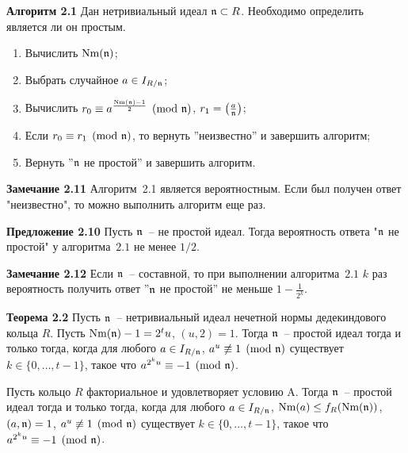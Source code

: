\documentclass[_00_autoref.tex]{subfiles}
\begin{document}
\textbf{Алгоритм 2.1}\label{algorithm:solovay_strassen}
    Дан нетривиальный идеал $\mathfrak{n} \subset R$.
    Необходимо определить является ли он простым.

    \begin{enumerate}
        \item Вычислить $\textrm{Nm}(\mathfrak{n})$;
        
        \item Выбрать случайное $a \in I_{R/\mathfrak{n}}$;

        \item Вычислить $r_0 \equiv a^{\frac{\textrm{Nm}(\mathfrak{n}) - 1}{2}} \pmod{\mathfrak{n}}$, $r_1 = \left(\frac{a}{\mathfrak{n}}\right)$;

        \item Если $r_0 \equiv r_1 \pmod{\mathfrak{n}}$, то вернуть ''неизвестно'' и завершить алгоритм;

        \item Вернуть ''$\mathfrak{n}$ не простой'' и завершить алгоритм.
    \end{enumerate}

\textbf{Замечание 2.11}
    Алгоритм~2.1 является вероятностным.
    Если был получен ответ "неизвестно", то можно выполнить алгоритм еще раз.

\textbf{Предложение 2.10}
    Пусть $\mathfrak{n}$~-- не простой идеал.
    Тогда вероятность ответа "$\mathfrak{n}$ не простой" у алгоритма~$2.1$ не менее $1/2$.

\textbf{Замечание 2.12}
    Если $\mathfrak{n}$~-- составной, то при выполнении алгоритма~$2.1$ $k$ раз вероятность получить ответ ''$\mathfrak{n}$ не простой'' не меньше $1 - \frac{1}{2^k}$.


\textbf{Теорема 2.2}\label{theorem:miller_criteria}
    Пусть $\mathfrak{n}$~-- нетривиальный идеал нечетной нормы дедекиндового кольца $R$.
    Пусть $\textrm{Nm}(\mathfrak{n}) - 1 = 2^t u$, $(u, 2) = 1$.
    Тогда $\mathfrak{n}$~-- простой идеал тогда и только тогда, когда для любого $a \in I_{R/\mathfrak{n}}$, $a^u \not\equiv 1 \pmod{\mathfrak{n}}$ существует $k\in \{0, \dots, t-1\}$, такое что $a^{2^{k}u} \equiv -1 \pmod{\mathfrak{n}}$.

    Пусть кольцо $R$ факториальное и удовлетворяет условию A.
    Тогда $\mathfrak{n}$~-- простой идеал тогда и только тогда, когда для любого $a \in I_{R/\mathfrak{n}}$, $\textrm{Nm}(a) \le f_R(\textrm{Nm}(\mathfrak{n}))$, $(a, \mathfrak{n}) = 1$, $a^u \not\equiv 1 \pmod{\mathfrak{n}}$ существует $k\in \{0, \dots, t-1\}$, такое что $a^{2^{k}u} \equiv -1 \pmod{\mathfrak{n}}$.
\end{document}
